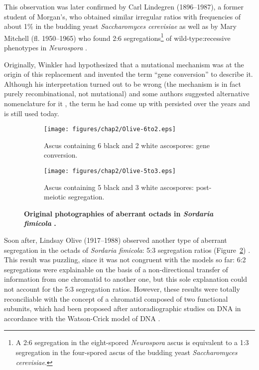 This observation was later confirmed by Carl Lindegren (1896--1987), a former student of Morgan's, who obtained similar irregular ratios with frequencies of about 1\% in the budding yeast \textit{Saccharomyces cerevisiae} \citep{lindegren1953gene} as well as by Mary Mitchell (fl. 1950--1965) who found 2:6 segregations\footnote{A 2:6 segregation in the eight-spored \textit{Neurospora} ascus is equivalent to a 1:3 segregation in the four-spored ascus of the budding yeast \textit{Saccharomyces cerevisiae}.} of wild-type:recessive phenotypes in \textit{Neurospora} \citep{mitchell1955aberrant, mitchell1955further}.

Originally, Winkler had hypothesized that a mutational mechanism was at the origin of this replacement and invented the term “gene conversion” to describe it. Although his interpretation turned out to be wrong (the mechanism is in fact purely recombinational, not mutational) and some authors suggested alternative nomenclature for it \citep[e.g.][]{roman1986early}, the term he had come up with persisted over the years and is still used today.\\




\begin{figure}[h]
	\centering
	\begin{subfigure}[b]{\textwidth}
		\texttt{[image: figures/chap2/Olive-6to2.eps]}
		\caption{Ascus containing 6 black and 2 white ascospores: gene conversion.}
\label{fig:sub-olive-6to2}
	\end{subfigure}

	\begin{subfigure}[b]{\textwidth}
		\texttt{[image: figures/chap2/Olive-5to3.eps]}
		\caption{Ascus containing 5 black and 3 white ascospores: post-meiotic segregation.}
\label{fig:sub-olive-5to3}
	\end{subfigure}

	\caption[Original photographies of aberrant octads in \textit{Sordaria fimicola} \citep{olive1959aberrant}]
	{\textbf{Original photographies of aberrant octads in \textit{Sordaria fimicola} \citep{olive1959aberrant}.}
	}
\label{fig:olive-octads}
\end{figure}




Soon after, Lindsay Olive (1917--1988) observed another type of aberrant segregation in the octads of \textit{Sordaria fimicola}: 5:3 segregation ratios (Figure~\ref{fig:sub-olive-5to3}) \citep{olive1959aberrant, kitani1962genetics}.
This result was puzzling, since it was not congruent with the models so far: 6:2 segregations were explainable on the basis of a non-directional transfer of information from one chromatid to another one, but this sole explanation could not account for the 5:3 segregation ratios. 
However, these results were totally reconciliable with the concept of a chromatid composed of two functional subunits, which had been proposed after autoradiographic studies on DNA \citep{taylor1957organization} in accordance with the Watson-Crick model of DNA \citep{watson1953molecular}.

